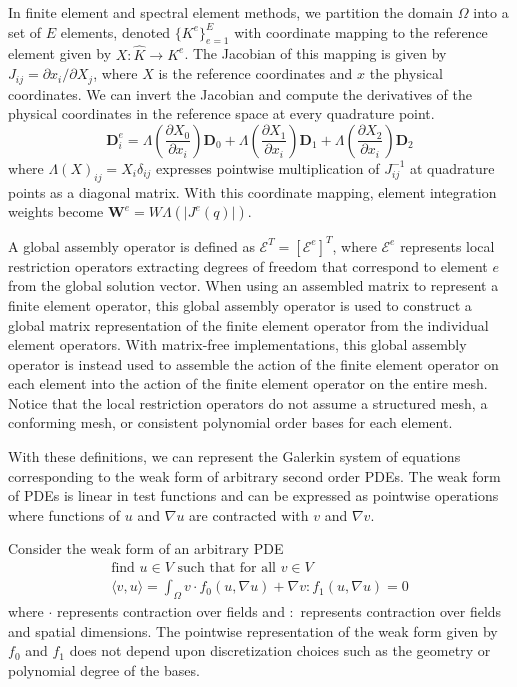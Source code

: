 In finite element and spectral element methods, we partition the domain $\Omega$ into a set of $E$ elements, denoted $\lbrace K^e \rbrace_{e = 1}^E$ with coordinate mapping to the reference element given by $X : \hat{K} \rightarrow K^e$.
The Jacobian of this mapping is given by $J_{i j} = \partial x_i / \partial X_j$, where $X$ is the reference coordinates and $x$ the physical coordinates.
We can invert the Jacobian and compute the derivatives of the physical coordinates in the reference space at every quadrature point.
\begin{equation}
\mathbf{D}_i^e = \Lambda \left( \frac{\partial X_0}{\partial x_i} \right) \mathbf{D}_0 + \Lambda \left( \frac{\partial X_1}{\partial x_i} \right) \mathbf{D}_1 + \Lambda \left( \frac{\partial X_2}{\partial x_i} \right) \mathbf{D}_2
\end{equation}
where $\Lambda \left( X \right)_{i j} = X_i \delta_{i j}$ expresses pointwise multiplication of $J_{i j}^{-1}$ at quadrature points as a diagonal matrix.
With this coordinate mapping, element integration weights become $\mathbf{W}^e = W \Lambda \left( \lvert J^e \left( q \right) \rvert \right)$.

A global assembly operator is defined as $\mathcal{E}^T = \left[ \mathcal{E}^e \right]^T$, where $\mathcal{E}^e$ represents local restriction operators extracting degrees of freedom that correspond to element $e$ from the global solution vector.
When using an assembled matrix to represent a finite element operator, this global assembly operator is used to construct a global matrix representation of the finite element operator from the individual element operators.
With matrix-free implementations, this global assembly operator is instead used to assemble the action of the finite element operator on each element into the action of the finite element operator on the entire mesh.
Notice that the local restriction operators do not assume a structured mesh, a conforming mesh, or consistent polynomial order bases for each element.

With these definitions, we can represent the Galerkin system of equations corresponding to the weak form of arbitrary second order PDEs.
The weak form of PDEs is linear in test functions and can be expressed as pointwise operations where functions of $u$ and $\nabla u$ are contracted with $v$ and $\nabla v$.

Consider the weak form of an arbitrary PDE
\begin{equation}
\begin{array}{c}
\text{find } u \in V \text{ such that for all } v \in V\\
\langle v, u \rangle = \int_{\Omega} v \cdot f_0 \left( u, \nabla u \right) + \nabla v : f_1 \left( u, \nabla u \right) = 0
\end{array}
\label{eq:weak_form}
\end{equation}
where $\cdot$ represents contraction over fields and $:$ represents contraction over fields and spatial dimensions.
The pointwise representation of the weak form given by $f_0$ and $f_1$ does not depend upon discretization choices such as the geometry or polynomial degree of the bases.

